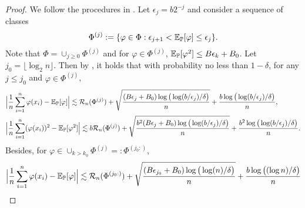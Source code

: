 \documentclass[11pt]{article}
\numberwithin{equation}{section}
\renewcommand{\P}{\mathbb{P}}
\begin{document}
\begin{proof}
    We follow the procedures in \citet{bousquet2002concentration}.
    Let $\epsilon_j=b2^{-j}$ and consider a sequence of classes
    \begin{equation}
        \Phi^{(j)}:=\{\varphi\in\Phi: \epsilon_{j+1}<\E_\P[\varphi] \leq \epsilon_j\}.
    \end{equation}
    Note that $\Phi=\cup_{j\geq 0}\Phi^{(j)}$ and for $\varphi\in\Phi^{(j)}$, $\E_\P[\varphi^2]\leq B\epsilon_k+B_0$.
    Let $j_0=\lfloor\log_2 n\rfloor$.
    Then by \citet[Lemma 6.1]{bousquet2002concentration}, it holds that with probability no less than $1-\delta$, for any $j\leq j_0$ and $\varphi\in\Phi^{(j)}$,
    \begin{align}
        &\Big|\frac{1}{n}\sum_{i=1}^n\varphi(x_i)-\E_\P[\varphi]\Big|\lesssim \mathcal{R}_n(\Phi^{(j)})+\sqrt{\frac{(B\epsilon_j+B_0)\log\big(\log(b/\epsilon_j)/\delta\big)}{n}} + \frac{b\log\big(\log(b/\epsilon_j)/\delta\big)}{n}, \label{eq:rademacher_1}\\
        &\Big|\frac{1}{n}\sum_{i=1}^n(\varphi(x_i))^2-\E_\P[\varphi^2]\Big|\lesssim b\mathcal{R}_n(\Phi^{(j)})+\sqrt{\frac{b^2(B\epsilon_j+B_0)\log\big(\log(b/\epsilon_j)/\delta\big)}{n}} + \frac{b^2\log\big(\log(b/\epsilon_j)/\delta\big)}{n}. \label{eq:rademacher_2}
    \end{align}
    Besides, for $\varphi\in\cup_{k>k_0}\Phi^{(j)}=:\Phi^{(j_0:)}$,
    \begin{equation}\label{eq:rademacher_3}
        \Big|\frac{1}{n}\sum_{i=1}^n\varphi(x_i)-\E_\P[\varphi]\Big|\lesssim \mathcal{R}_n(\Phi^{(j_0:)})+\sqrt{\frac{(B\epsilon_{j_0}+B_0)\log\big(\log(n)/\delta\big)}{n}} + \frac{b\log\big((\log n)/\delta\big)}{n}
    \end{equation}
    

\end{proof}
\end{document}
